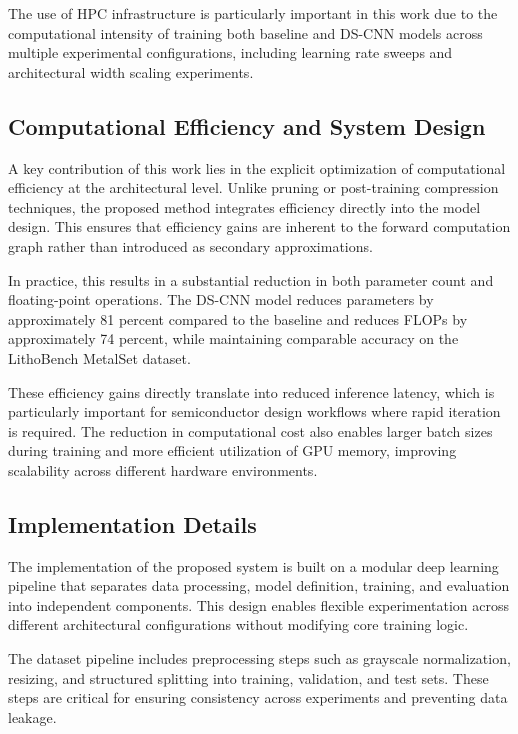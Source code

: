 \documentclass[conference]{IEEEtran}
\begin{document}
The use of HPC infrastructure is particularly important in this work due to the computational intensity of training both baseline and DS-CNN models across multiple experimental configurations, including learning rate sweeps and architectural width scaling experiments.

\subsection{\textbf{Computational Efficiency and System Design}}

A key contribution of this work lies in the explicit optimization of computational efficiency at the architectural level. Unlike pruning or post-training compression techniques, the proposed method integrates efficiency directly into the model design. This ensures that efficiency gains are inherent to the forward computation graph rather than introduced as secondary approximations.

In practice, this results in a substantial reduction in both parameter count and floating-point operations. The DS-CNN model reduces parameters by approximately 81 percent compared to the baseline and reduces FLOPs by approximately 74 percent, while maintaining comparable accuracy on the LithoBench MetalSet dataset.





These efficiency gains directly translate into reduced inference latency, which is particularly important for semiconductor design workflows where rapid iteration is required. The reduction in computational cost also enables larger batch sizes during training and more efficient utilization of GPU memory, improving scalability across different hardware environments.

\subsection{\textbf{Implementation Details}}

The implementation of the proposed system is built on a modular deep learning pipeline that separates data processing, model definition, training, and evaluation into independent components. This design enables flexible experimentation across different architectural configurations without modifying core training logic.

The dataset pipeline includes preprocessing steps such as grayscale normalization, resizing, and structured splitting into training, validation, and test sets. These steps are critical for ensuring consistency across experiments and preventing data leakage.
\end{document}

